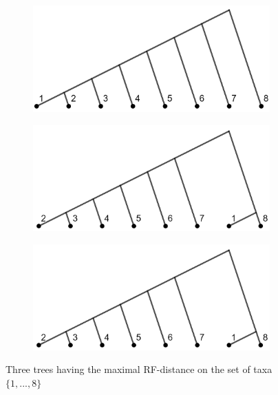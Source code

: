 \begin{figure}[ht!]\label{fig:maxRFdist}
    \begin{subfigure}[b]{0.45\textwidth}
        \includegraphics[width=\textwidth]{figures/RF_tree1.jpg}
    \end{subfigure}
    \quad
    \begin{subfigure}[b]{0.45\textwidth}
        \includegraphics[width=\textwidth]{figures/RF_tree2.jpg}
    \end{subfigure}
    \quad
    \begin{subfigure}[b]{0.45\textwidth}
        \includegraphics[width=\textwidth]{figures/RF_tree2.jpg}
    \end{subfigure}
    \caption{Three trees having the maximal RF-distance on the set of taxa $\{1,...,8\}$}
\end{figure}
 
